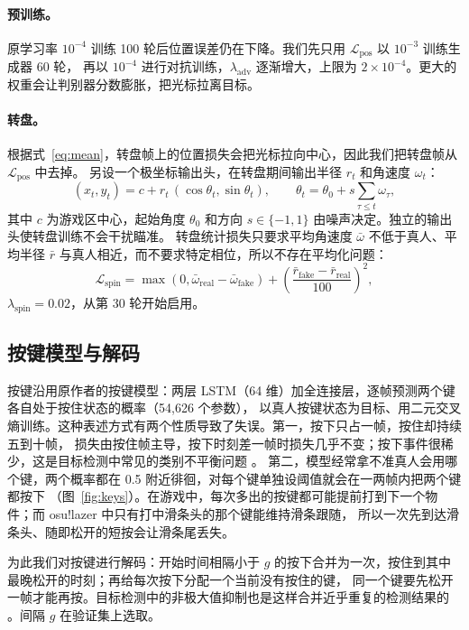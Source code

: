 \documentclass[11pt,a4paper,fontset=windows]{ctexart}
\begin{document}
\paragraph{预训练。} 原学习率 $10^{-4}$ 训练 100 轮后位置误差仍在下降。我们先只用 $\mathcal{L}_{\mathrm{pos}}$ 以 $10^{-3}$ 训练生成器 60 轮，
再以 $10^{-4}$ 进行对抗训练，$\lambda_{\mathrm{adv}}$ 逐渐增大，上限为 $2\times10^{-4}$。更大的权重会让判别器分数膨胀，把光标拉离目标。

\paragraph{转盘。} 根据式~\eqref{eq:mean}，转盘帧上的位置损失会把光标拉向中心，因此我们把转盘帧从 $\mathcal{L}_{\mathrm{pos}}$ 中去掉。
另设一个极坐标输出头，在转盘期间输出半径 $r_t$ 和角速度 $\omega_t$：
\begin{equation}
  (x_t,y_t)=c+r_t\,(\cos\theta_t,\sin\theta_t),\qquad \theta_t=\theta_0+s\sum_{\tau\le t}\omega_\tau,
\end{equation}
其中 $c$ 为游戏区中心，起始角度 $\theta_0$ 和方向 $s\in\{-1,1\}$ 由噪声决定。独立的输出头使转盘训练不会干扰瞄准。
转盘统计损失只要求平均角速度 $\bar\omega$ 不低于真人、平均半径 $\bar r$ 与真人相近，而不要求特定相位，所以不存在平均化问题：
\begin{equation}
  \mathcal{L}_{\mathrm{spin}}=\max(0,\bar\omega_{\mathrm{real}}-\bar\omega_{\mathrm{fake}})
  +\left(\frac{\bar r_{\mathrm{fake}}-\bar r_{\mathrm{real}}}{100}\right)^2,
\end{equation}
$\lambda_{\mathrm{spin}}=0.02$，从第 30 轮开始启用。

\subsection{按键模型与解码}
按键沿用原作者的按键模型：两层 LSTM（64 维）加全连接层，逐帧预测两个键各自处于按住状态的概率（54{,}626 个参数），
以真人按键状态为目标、用二元交叉熵训练。这种表述方式有两个性质导致了失误。第一，按下只占一帧，按住却持续五到十帧，
损失由按住帧主导，按下时刻差一帧时损失几乎不变；按下事件很稀少，这是目标检测中常见的类别不平衡问题 \citep{lin2017}。
第二，模型经常拿不准真人会用哪个键，两个概率都在 0.5 附近徘徊，对每个键单独设阈值就会在一两帧内把两个键都按下
（图~\ref{fig:keys}）。在游戏中，每次多出的按键都可能提前打到下一个物件；而 osu!lazer 中只有打中滑条头的那个键能维持滑条跟随，
所以一次先到达滑条头、随即松开的短按会让滑条尾丢失。

为此我们对按键进行解码：开始时间相隔小于 $g$ 的按下合并为一次，按住到其中最晚松开的时刻；再给每次按下分配一个当前没有按住的键，
同一个键要先松开一帧才能再按。目标检测中的非极大值抑制也是这样合并近乎重复的检测结果的 \citep{neubeck2006}。间隔 $g$ 在验证集上选取。
\end{document}
